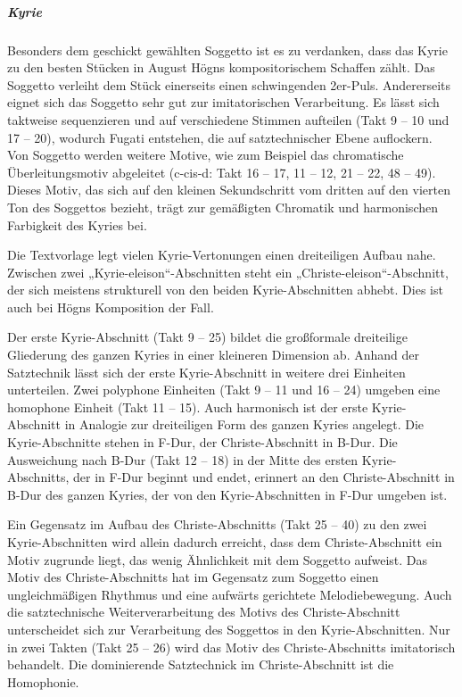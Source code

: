 \subparagraph{Kyrie}
Besonders dem geschickt gewählten Soggetto ist es zu verdanken, dass das
Kyrie zu den besten Stücken in August Högns kompositorischem Schaffen
zählt. Das Soggetto verleiht dem Stück einerseits einen schwingenden
2er-Puls. Andererseits eignet sich das Soggetto sehr gut zur
imitatorischen Verarbeitung. Es lässt sich taktweise sequenzieren und
auf verschiedene Stimmen aufteilen (Takt 9 – 10 und 17 – 20), wodurch
Fugati entstehen, die auf satztechnischer Ebene auflockern. Von
Soggetto werden weitere Motive, wie zum Beispiel das chromatische
Überleitungsmotiv abgeleitet (c-cis-d: Takt 16 – 17, 11 – 12, 21 – 22,
48 – 49). Dieses Motiv, das sich auf den kleinen Sekundschritt vom
dritten auf den vierten Ton des Soggettos bezieht, trägt zur gemäßigten
Chromatik und harmonischen Farbigkeit des Kyries bei.

Die Textvorlage legt vielen Kyrie-Vertonungen einen dreiteiligen Aufbau
nahe. Zwischen zwei „Kyrie-eleison“-Abschnitten steht ein
„Christe-eleison“-Abschnitt, der sich meistens strukturell von den
beiden Kyrie-Abschnitten abhebt. Dies ist auch bei Högns Komposition
der Fall.

Der erste Kyrie-Abschnitt (Takt 9 – 25) bildet die großformale
dreiteilige Gliederung des ganzen Kyries in einer kleineren Dimension
ab. Anhand der Satztechnik lässt sich der erste Kyrie-Abschnitt in
weitere drei Einheiten unterteilen. Zwei polyphone Einheiten (Takt 9 –
11 und 16 – 24) umgeben eine homophone Einheit (Takt 11 – 15). Auch
harmonisch ist der erste Kyrie-Abschnitt in Analogie zur dreiteiligen
Form des ganzen Kyries angelegt. Die Kyrie-Abschnitte stehen in F-Dur,
der Christe-Abschnitt in B-Dur. Die Ausweichung nach B-Dur (Takt 12 –
18) in der Mitte des ersten Kyrie-Abschnitts, der in F-Dur beginnt und
endet, erinnert an den Christe-Abschnitt in B-Dur des ganzen Kyries,
der von den Kyrie-Abschnitten in F-Dur umgeben ist.

Ein Gegensatz im Aufbau des Christe-Abschnitts (Takt 25 – 40) zu den
zwei Kyrie-Abschnitten wird allein dadurch erreicht, dass dem
Christe-Abschnitt ein Motiv zugrunde liegt, das wenig Ähnlichkeit mit
dem Soggetto aufweist. Das Motiv des Christe-Abschnitts hat im
Gegensatz zum Soggetto einen ungleichmäßigen Rhythmus und eine aufwärts
gerichtete Melodiebewegung. Auch die satztechnische Weiterverarbeitung
des Motivs des Christe-Abschnitt unterscheidet sich zur Verarbeitung
des Soggettos in den Kyrie-Abschnitten. Nur in zwei Takten (Takt 25 –
26) wird das Motiv des Christe-Abschnitts imitatorisch behandelt. Die
dominierende Satztechnick im Christe-Abschnitt ist die Homophonie.

